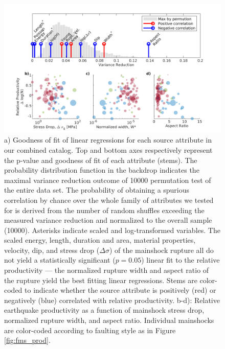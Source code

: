 \documentclass[draft]{agujournal}
\begin{document}
\begin{figure}[H]
\centering
\includegraphics{figures/stem_plot_mw5.png}
\caption{a) Goodness of fit of linear regressions for each source attribute in our combined catalog. Top and bottom axes respectively represent the p-value and goodness of fit of each attribute (stems). The probability distribution function in the backdrop indicates the maximal variance reduction outcome of 10000 permutation test of the entire data set. The probability of obtaining a spurious correlation by chance over the whole family of attributes we tested for is derived from the number of random shuffles exceeding the measured variance reduction and normalized to the overall sample (10000). Asterisks indicate scaled and log-transformed variables. The scaled energy, length, duration and area, material properties, velocity, dip, and stress drop ($\Delta\sigma$) of the mainshock rupture all do not yield a statistically significant ($p=0.05$) linear fit to the relative productivity — the normalized rupture width and aspect ratio of the rupture yield the best fitting linear regressions. Stems are color-coded to indicate whether the source attribute is positively (red) or negatively (blue) correlated with relative productivity. b-d): Relative earthquake productivity as a function of mainshock stress drop, normalized rupture width, and aspect ratio. Individual mainshocks are color-coded according to faulting style as in Figure \ref{fig:fms_prod}.}
\label{fig:r2_finite_fault}
\end{figure}
\end{document}
